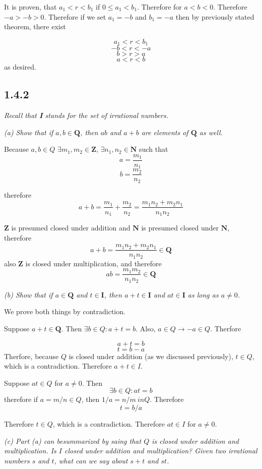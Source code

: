 \documentclass[11pt,oneside,titlepage]{book}
\begin{document}
It is  proven, that $a_1 < r < b_1$ if $0 \leq a_1 < b_1$. Therefore for
$a < b < 0$. Therefore $-a > -b > 0$. Therefore if we set $a_1 = -b$ and
$b_1 = -a$ then by previously stated theorem, there exist

$$a_1 < r < b_1$$
$$-b  < r < -a$$
$$b  > r > a$$
$$a < r < b$$
as desired.

\subsection*{1.4.2}
\textit{Recall that \textbf{I} stands for the set of irrational numbers.}

\textit{(a) Show that if $a,b \in \textbf{Q}$, then $ab$ and $a + b$ are
  elements of $\textbf{Q}$ as well.}

Because $a,b \in Q$ $\exists m_1,m_2 \in \textbf{Z}$, $\exists n_1,n_2 \in
\textbf{N}$ such that
$$a = \frac{m_1}{n_1}$$
$$b = \frac{m_2}{n_2}$$

therefore
$$a + b = \frac{m_1}{n_1} + \frac{m_2}{n_2} =
\frac{m_1 n_2 + m_2 n_1}{n_1 n_2}$$

$\textbf{Z}$ is presumed closed under addition and $\textbf{N}$ is presumed
closed under $\textbf{N}$, therefore 
$$ a + b = \frac{m_1 n_2 + m_2 n_1}{n_1 n_2} \in \textbf{Q}$$
also $\textbf{Z}$ is closed under multiplication, and therefore
$$ a  b = \frac{m_1 m_2}{n_1 n_2} \in \textbf{Q}$$

\textit{(b) Show that if $a \in \textbf{Q}$ and $t \in \textbf{I}$, then
  $a + t \in \textbf{I}$ and $at \in \textbf{I}$ as long as $a \neq 0$.}

We prove both things by contradiction.

Suppose $a + t \in \textbf{Q}$. Then $\exists b \in Q: a + t = b$. Also,
$a \in Q \to -a \in Q$. Therfore

$$a + t = b$$
$$t = b - a$$
Therfore, because $Q$ is closed under addition (as we discussed previously),
$t \in Q$, which is a contradiction. Therefore $a + t \in I$.

Suppose $at \in Q$ for $a \neq 0$. Then
$$\exists b \in Q: at = b $$
therefore if $a = m/n \in Q$, then $1/a = n / m \ in Q$. Therefore
$$t = b/a$$

Therefore $t \in Q$, which is a contradiction. Therefore $at \in I$ for
$a \neq 0$.

\textit{(c) Part (a) can besummarized by saing that $Q$ is closed under
  addition and multiplication. Is $I$ closed under addition and
  multiplication? Given two irrational numbers $s$ and $t$, what can we say
  about $s + t$ and $st$.}
\end{document}
